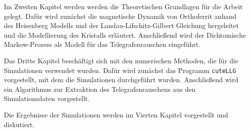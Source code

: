 \documentclass[main.tex]{subfiles}
\begin{document}
Im Zweiten Kapitel werden werden die Theoretischen Grundlagen für die Arbeit gelegt. Dafür wird zunächst die magnetische Dynamik von Orthoferrit anhand des Heisenberg Modells und der Landau-Lifschitz-Gilbert Gleichung hergeleitet und die Modellierung des  Kristalls erläutert.
Anschließend wird der Dichtomische Markow-Prozess als Modell für das Telegrafenrauschen eingeführt.

Das Dritte Kapitel beschäftigt sich mit den numerischen Methoden, die für die Simulationen verwendet wurden. Dafür wird zunächst das Programm \texttt{cuteLLG} vorgestellt, mit dem die Simulationen durchgeführt wurden. Anschließend wird ein Algorithmus zur Extraktion des Telegrafenrauschens aus den Simulationsdaten vorgestellt.

Die Ergebnisse der Simulationen werden im Vierten Kapitel vorgestellt und diskutiert. 

\newpage {}
\end{document}
